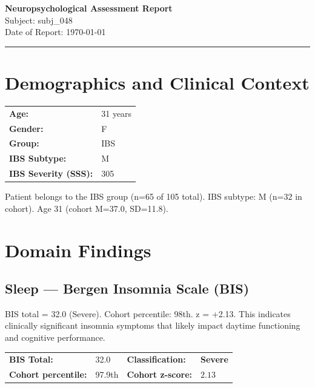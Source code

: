 \documentclass[11pt,a4paper]{article}
\begin{document}
\begin{center}
{\LARGE\bfseries Neuropsychological Assessment Report}\\[0.5em]
{\large Subject: subj\_048}\\[0.3em]
{\normalsize Date of Report: \today}
\end{center}

\vspace{0.5em}
\noindent\rule{\textwidth}{0.4pt}

\section{Demographics and Clinical Context}

\begin{tabular}{ll}
\textbf{Age:} & 31 years \\
\textbf{Gender:} & F \\
\textbf{Group:} & IBS \\
\textbf{IBS Subtype:} & M \\
\textbf{IBS Severity (SSS):} & 305 \\
\end{tabular}

\medskip\noindent Patient belongs to the IBS group (n=65 of 105 total). IBS subtype: M (n=32 in cohort). Age 31 (cohort M=37.0, SD=11.8). 

\section{Domain Findings}

\subsection{Sleep --- Bergen Insomnia Scale (BIS)}
BIS total = 32.0 (Severe). Cohort percentile: 98th. z = +2.13. This indicates clinically significant insomnia symptoms that likely impact daytime functioning and cognitive performance.

\noindent\begin{tabular}{llll}
\textbf{BIS Total:} & 32.0 &
\textbf{Classification:} & \textbf{Severe} \\
\textbf{Cohort percentile:} & 97.9th &
\textbf{Cohort z-score:} & $2.13$ \\
\end{tabular}
\end{document}
